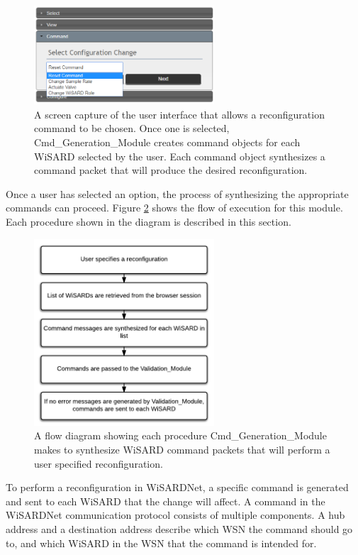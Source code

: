\begin{figure}[H]
	\centering
	\includegraphics[width=0.6\textwidth]{figures/jsp_ui_cmd.png}
	\caption{A screen capture of the user interface that allows a reconfiguration command to be chosen. Once one is selected, Cmd\_Generation\_Module creates command objects for each WiSARD selected by the user. Each command object synthesizes a command packet that will produce the desired reconfiguration.}
	\label{fig:jsp_ui_cmd}
\end{figure}

Once a user has selected an option, the process of synthesizing the appropriate commands can proceed. Figure \ref{fig:flow_cmd_generator} shows the flow of execution for this module. Each procedure shown in the diagram is described in this section.\\

\begin{figure}[H]
	\centering
	\includegraphics[width=0.6\textwidth]{figures/flow_diagram_cmd_module.png}
	\caption{A flow diagram showing each procedure Cmd\_Generation\_Module makes to synthesize WiSARD command packets that will perform a user specified reconfiguration.}
	\label{fig:flow_cmd_generator}
\end{figure}

To perform a reconfiguration in WiSARDNet, a specific command is generated and sent to each WiSARD that the change will affect. A command in the WiSARDNet communication protocol consists of multiple components. A hub address and a destination address describe which WSN the command should go to, and which WiSARD in the WSN that the command is intended for.

